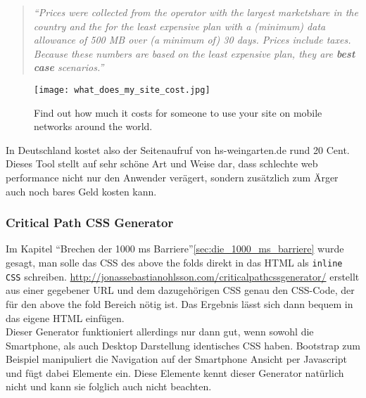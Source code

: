 			\begin{quote}
				\textit{"`Prices were collected from the operator with the largest marketshare in the country and the for the least expensive plan with a (minimum) data allowance of 500 MB over (a minimum of) 30 days. Prices include taxes. Because these numbers are based on the least expensive plan, they are \textbf{best case} scenarios."'}\autocite{siteCosts}
			\end{quote}

		\begin{figure}[htbp]
			\begin{center}
				\texttt{[image: what\_does\_my\_site\_cost.jpg]}
				\caption{Find out how much it costs for someone to use your site on mobile networks around the world.\autocite{siteCosts}}
				\label{fig:what_does_my_site_cost}
			\end{center}
		\end{figure}

		In Deutschland kostet also der Seitenaufruf von hs-weingarten.de rund 20 Cent. Dieses Tool stellt auf sehr schöne Art und Weise dar, dass schlechte web performance nicht nur den Anwender verägert, sondern zusätzlich zum Ärger auch noch bares Geld kosten kann.

		\subsubsection{Critical Path CSS Generator} %
		\label{ssub:critical_path_css_generator}
			Im Kapitel "`Brechen der 1000 ms Barriere"'\ref{sec:die_1000_ms_barriere} wurde gesagt, man solle das CSS des above the folds direkt in das HTML als \texttt{inline CSS} schreiben. \url{http://jonassebastianohlsson.com/criticalpathcssgenerator/} erstellt aus einer gegebener URL und dem dazugehörigen CSS genau den CSS-Code, der für den above the fold Bereich nötig ist. Das Ergebnis lässt sich dann bequem in das eigene HTML einfügen.\\

			Dieser Generator funktioniert allerdings nur dann gut, wenn sowohl die Smartphone, als auch Desktop Darstellung identisches CSS haben. Bootstrap zum Beispiel manipuliert die Navigation auf der Smartphone Ansicht per Javascript und fügt dabei Elemente ein. Diese Elemente kennt dieser Generator natürlich nicht und kann sie folglich auch nicht beachten.



